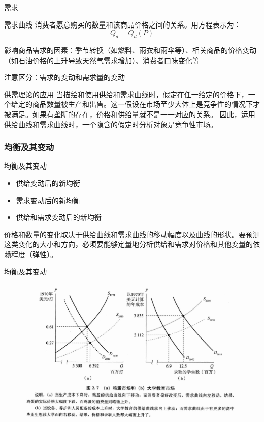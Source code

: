 \documentclass[UTF8]{ctexbeamer}
\begin{document}
\begin{frame}{需求}
\begin{block}{需求曲线}
消费者愿意购买的数量和该商品价格之间的关系。\newline 用方程表示为：
\begin{equation*}
Q_d = Q_d(P)
\end{equation*}
\end{block}
影响商品需求的因素：季节转换（如燃料、雨衣和雨伞等）、相关商品的价格变动（如石油价格的上升导致天然气需求增加）、消费者口味变化等 \newline

注意区分：{\heiti 需求的变动}和{\heiti 需求量的变动}
\end{frame}

\begin{frame}{供需理论的应用}
\linespread{1.5}
当描绘和使用供给和需求曲线时，假定在任一给定的价格下，一个给定的商品数量被生产和出售。这一假设在市场至少大体上是竞争性的情况下才被满足。如果有垄断的存在，价格和供给量就不是一一对应的关系。\newline
因此，{\heiti 运用供给曲线和需求曲线时，一个隐含的假定时分析对象是竞争性市场。}
\end{frame}

\subsubsection{均衡及其变动}
\begin{frame}{均衡及其变动}
\linespread{1.5}
\begin{itemize}
\item 供给变动后的新均衡
\item 需求变动后的新均衡
\item 供给和需求变动后的新均衡
\end{itemize}
价格和数量的变化取决于供给曲线和需求曲线的移动幅度以及曲线的形状。要预测这类变化的大小和方向，必须要能够定量地分析供给和需求对价格和其他变量的依赖程度（弹性）。
\end{frame}

\begin{frame}{均衡及其变动}
\begin{figure}
\centering
\includegraphics[width=110mm]{figures/2_1.png}
\end{figure}
\end{frame}
\end{document}
